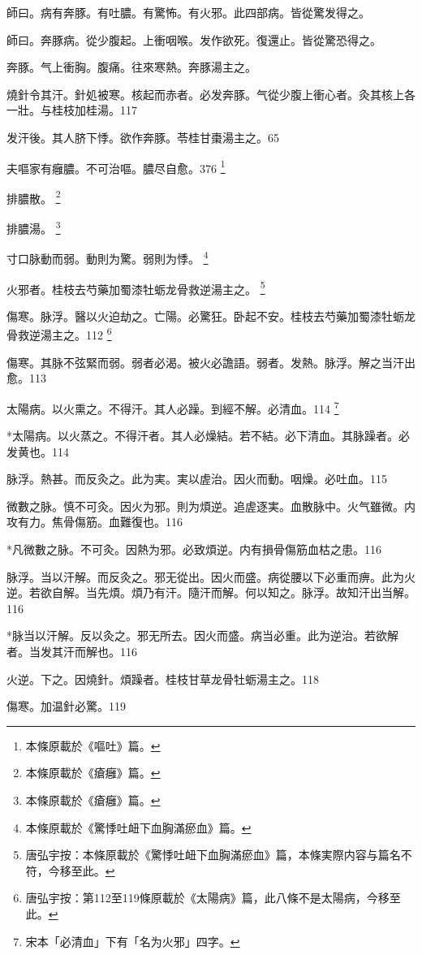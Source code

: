 師曰。病有奔豚。有吐膿。有驚怖。有火邪。此四部病。皆從驚发得之。

師曰。奔豚病。從少腹起。上衝咽喉。发作欲死。復還止。皆從驚恐得之。

奔豚。气上衝胸。腹痛。往來寒熱。奔豚湯主之。

燒針令其汗。針処被寒。核起而赤者。必发奔豚。气從少腹上衝心者。灸其核上各一壯。与桂枝加桂湯。117

发汗後。其人脐下悸。欲作奔豚。苓桂甘棗湯主之。65

夫嘔家有癰膿。不可治嘔。膿尽自愈。376
	\footnote{本條原載於《嘔吐》篇。}

排膿散。
	\footnote{本條原載於《瘡癰》篇。}

排膿湯。
	\footnote{本條原載於《瘡癰》篇。}

寸口脉動而弱。動則为驚。弱則为悸。
	\footnote{本條原載於《驚悸吐衄下血胸滿瘀血》篇。}

火邪者。桂枝去芍藥加蜀漆牡蛎龙骨救逆湯主之。
	\footnote{唐弘宇按：本條原載於《驚悸吐衄下血胸滿瘀血》篇，本條実際内容与篇名不符，今移至此。}

傷寒。脉浮。醫以火迫劫之。亡陽。{\khaaitp 必}驚狂。卧起不安。桂枝去芍藥加蜀漆牡蛎龙骨救逆湯主之。112
	\footnote{唐弘宇按：第112至119條原載於《太陽病》篇，此八條不是太陽病，今移至此。}

傷寒。其脉不弦緊而弱{\khaaitp 。弱}者必渴。被火必譫語。{\khaaitp 弱者。发熱。脉浮。解之当汗出愈。}113

太陽病。以火熏之。不得汗。其人必躁。到經不解。必清血。114
	\footnote{宋本「必清血」下有「名为火邪」四字。}

*太陽病。以火蒸之。不得汗者。其人必燥結。若不結。必下清血。其脉躁者。必发黄也。{\gaoben}114

脉浮。熱甚。而反灸之。此为実。実以虗治。因火而動。咽燥。必吐血。115

微數之脉。慎不可灸。因火为邪。則为煩逆。追虗逐実。血散脉中。火气雖微。内攻有力。焦骨傷筋。血難復也。116

*凡微數之脉。不可灸。因熱为邪。必致煩逆。内有損骨傷筋血枯之患。{\gaoben}116

脉浮。当以汗解。而反灸之。邪无從出。因火而盛。病從腰以下必重而痹。此为火逆。若欲自解。当先煩。煩乃有汗。隨汗而解。何以知之。脉浮。故知汗出当解。116

*脉当以汗解。反以灸之。邪无所去。因火而盛。病当必重。此为逆治。若欲解者。当发其汗而解也。{\gaoben}116

火逆。下之。因燒針。煩躁者。桂枝甘草龙骨牡蛎湯主之。118

傷寒。加温針必驚。119

